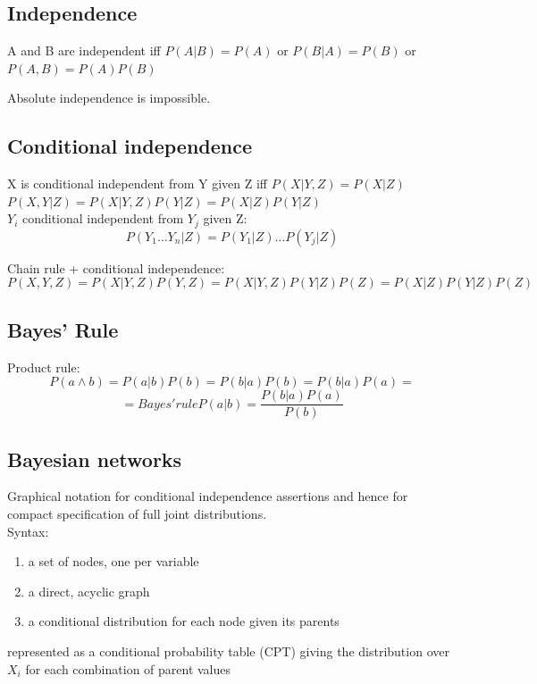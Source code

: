 \subsection{Independence}
A and B are independent iff
$P(A|B) = P(A)$ or $P(B|A) = P(B)$ or $P(A, B) = P(A)P(B)$

Absolute independence is impossible.

\subsection{Conditional independence}

X is conditional independent from Y given Z iff $P(X|Y,Z) = P(X|Z)$ \\
$P(X,Y|Z) = P(X|Y,Z)P(Y|Z) = P(X|Z)P(Y|Z)$ \\

$Y_{i}$ conditional independent from $Y_{j}$ given Z:
\[P(Y_{1}\dots Y_{n}|Z) = P(Y_{1}|Z)\dots P(Y_{j}|Z)\]

Chain rule + conditional independence:
\[P(X,Y,Z) = P(X|Y,Z)P(Y,Z) = P(X|Y,Z)P(Y|Z)P(Z) = P(X|Z)P(Y|Z)P(Z)\]
\subsection{Bayes' Rule}
Product rule:
\[P(a\land b) = P(a|b)P(b) = P(b|a)P(b) = P(b|a)P(a) = \]
\[= Bayes'rule P(a|b) = \frac{P(b|a)P(a)}{P(b)}\]

\subsection{Bayesian networks}

Graphical notation for conditional independence assertions and hence for compact specification of full joint distributions.\\
Syntax:
\begin{enumerate}
    \item a set of nodes, one per variable
    \item a direct, acyclic graph
    \item a conditional distribution for each node given its parents 
\end{enumerate}
represented as a conditional probability table (CPT) giving the distribution over $X_{i}$ for each combination of parent values
